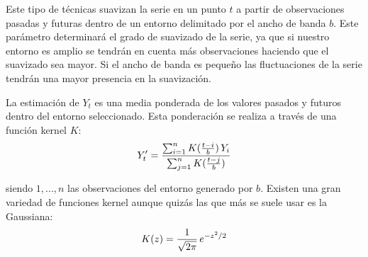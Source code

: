 \documentclass[12pt,a4paper,oneside]{article}
\begin{document}
Este tipo de técnicas suavizan la serie en un punto $t$ a partir de observaciones pasadas y futuras dentro de un entorno delimitado por el ancho de banda $b$. Este parámetro determinará el grado de suavizado de la serie, ya que si nuestro entorno es amplio se tendrán en cuenta más observaciones haciendo que el suavizado sea mayor. Si el ancho de banda es pequeño las fluctuaciones de la serie tendrán una mayor presencia en la suavización.

La estimación de $Y_{t}$ es una media ponderada de los valores pasados y futuros dentro del entorno seleccionado. Esta ponderación se realiza a través de una función kernel $K$:
\begin{equation}
   Y'_{t} = \frac{\sum_{i = 1}^{n} K(\frac{t-i}{b}) \thinspace Y_{i}}{\sum_{j = 1}^{n} K(\frac{t-j}{b})}
\end{equation}

\noindent siendo $1,...,n$ las observaciones del entorno generado por $b$. Existen una gran variedad de funciones kernel aunque quizás las que más se suele usar es la Gaussiana:
\begin{equation}
   K(z) = \frac{1}{\sqrt{2 \pi}} \thinspace e^{-z^2/2}
\end{equation} 
\end{document}
